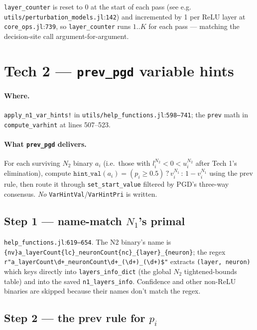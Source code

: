 \documentclass[11pt]{article}
\newcommand{\src}[1]{\texttt{\small #1}}
\newcommand{\fileline}[2]{\src{#1}:\src{#2}}
\begin{document}
\src{layer\_counter} is reset to 0 at the start of each pass
(see e.g. \fileline{utils/perturbation\_models.jl}{142}) and
incremented by 1 per ReLU layer at \fileline{core\_ops.jl}{739}, so
\src{layer\_counter} runs $1..K$ for each pass --- matching the
decision-site call argument-for-argument.

\section{Tech 2 --- \texttt{prev\_pgd} variable hints}
\label{sec:prevpgd}

\paragraph{Where.}
\src{apply\_n1\_var\_hints!} in
\fileline{utils/help\_functions.jl}{598--741}; the \texttt{prev}
math in \src{compute\_varhint} at lines 507--523.

\paragraph{What \texttt{prev\_pgd} delivers.}
For each surviving $N_2$ binary $a_i$ (i.e.\ those with
$l^{N_2}_i < 0 < u^{N_2}_i$ after Tech 1's elimination), compute
\(
  \mathtt{hint\_val}(a_i) = (p_i \ge 0.5)\,?\, v^{N_1}_i \,:\, 1 - v^{N_1}_i
\)
using the prev rule, then route it through \src{set\_start\_value}
filtered by PGD's three-way consensus. \emph{No}
\texttt{VarHintVal}/\texttt{VarHintPri} is written.

\subsection{Step 1 --- name-match $N_1$'s primal}

\fileline{help\_functions.jl}{619--654}. The N2 binary's name is
\src{\{nv\}a\_layerCount\{lc\}\_neuronCount\{nc\}\_\{layer\}\_\{neuron\}};
the regex \src{r"a\_layerCount\textbackslash d+\_neuronCount\textbackslash d+\_(\textbackslash d+)\_(\textbackslash d+)\$"}
extracts \src{(layer, neuron)} which keys directly into
\src{layers\_info\_dict} (the global $N_2$ tightened-bounds table)
and into the saved \src{n1\_layers\_info}. Confidence and other
non-ReLU binaries are skipped because their names don't match the
regex.

\subsection{Step 2 --- the prev rule for $p_i$}
\end{document}
